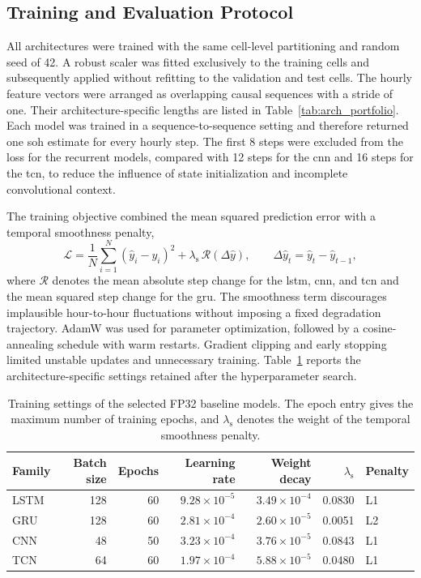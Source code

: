 \documentclass[final,3p,times]{elsarticle}
\begin{document}
\subsection{Training and Evaluation Protocol}
All architectures were trained with the same cell-level partitioning and random seed of 42. A robust scaler was fitted exclusively to the training cells and subsequently applied without refitting to the validation and test cells. The hourly feature vectors were arranged as overlapping causal sequences with a stride of one. Their architecture-specific lengths are listed in Table~\ref{tab:arch_portfolio}. Each model was trained in a sequence-to-sequence setting and therefore returned one \ac{soh} estimate for every hourly step. The first 8 steps were excluded from the loss for the recurrent models, compared with 12 steps for the \ac{cnn} and 16 steps for the \ac{tcn}, to reduce the influence of state initialization and incomplete convolutional context.

The training objective combined the mean squared prediction error with a temporal smoothness penalty,
\begin{equation}
    \mathcal{L}
    = \frac{1}{N}\sum_{i=1}^{N}\left(\hat{y}_i-y_i\right)^2
    + \lambda_{\mathrm{s}}\,\mathcal{R}\!\left(\Delta\hat{y}\right),
    \qquad
    \Delta\hat{y}_t=\hat{y}_t-\hat{y}_{t-1},
\end{equation}
where $\mathcal{R}$ denotes the mean absolute step change for the \ac{lstm}, \ac{cnn}, and \ac{tcn} and the mean squared step change for the \ac{gru}. The smoothness term discourages implausible hour-to-hour fluctuations without imposing a fixed degradation trajectory. AdamW was used for parameter optimization, followed by a cosine-annealing schedule with warm restarts. Gradient clipping and early stopping limited unstable updates and unnecessary training. Table~\ref{tab:training_protocol} reports the architecture-specific settings retained after the hyperparameter search.

\begin{table}[t]
\centering
\caption{Training settings of the selected FP32 baseline models. The epoch entry gives the maximum number of training epochs, and $\lambda_{\mathrm{s}}$ denotes the weight of the temporal smoothness penalty.}
\label{tab:training_protocol}
\small
\begin{tabular}{lrrrrrl}
\toprule
Family & Batch size & Epochs & Learning rate & Weight decay & $\lambda_{\mathrm{s}}$ & Penalty \\
\midrule
LSTM & 128 & 60 & $9.28\times10^{-5}$ & $3.49\times10^{-4}$ & 0.0830 & L1 \\
GRU  & 128 & 60 & $2.81\times10^{-4}$ & $2.60\times10^{-5}$ & 0.0051 & L2 \\
CNN  & 48  & 50 & $3.23\times10^{-4}$ & $3.76\times10^{-5}$ & 0.0843 & L1 \\
TCN  & 64  & 60 & $1.97\times10^{-4}$ & $5.88\times10^{-5}$ & 0.0480 & L1 \\
\bottomrule
\end{tabular}
\end{table}
\end{document}
